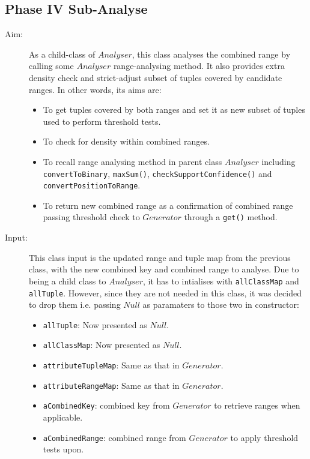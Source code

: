 \subsection{Phase IV Sub-Analyse}

\begin{description}

\item[Aim: ] As a child-class of $Analyser$, this class analyses the combined range by calling some $Analyser$ range-analysing method. It also provides extra density check and strict-adjust subset of tuples covered by candidate ranges. In other words, its aims are:
\begin{itemize}
	\item{To get tuples covered by both ranges and set it as new subset of tuples used to perform threshold tests.}
	\item{To check for density within combined ranges.} 
	\item{To recall range analysing method in parent class $Analyser$ including \texttt{convertToBinary}, \texttt{maxSum()}, \texttt{checkSupportConfidence()} and \texttt{convertPositionToRange}.} 
	\item{To return new combined range as a confirmation of combined range passing threshold check to $Generator$ through a \texttt{get()} method.}
\end{itemize}

\item[Input: ] This class input is the updated range and tuple map from the previous class, with the new combined key and combined range to analyse. Due to being a child class to $Analyser$, it has to intialises with \texttt{allClassMap} and \texttt{allTuple}. However, since they are not needed in this class, it was decided to drop them i.e. passing $Null$ as paramaters to those two in constructor:
\begin{itemize}
	\item{\texttt{allTuple}:  Now presented as $Null$.} 
	\item{\texttt{allClassMap}: Now presented as $Null$.}
	\item{\texttt{attributeTupleMap}: Same as that in $Generator$.}
	\item{\texttt{attributeRangeMap}: Same as that in $Generator$.}
	\item{\texttt{aCombinedKey}: combined key from $Generator$ to retrieve ranges when applicable.}
	\item{\texttt{aCombinedRange}: combined range from $Generator$ to apply threshold tests upon.}
\end{itemize}


\end{description}

